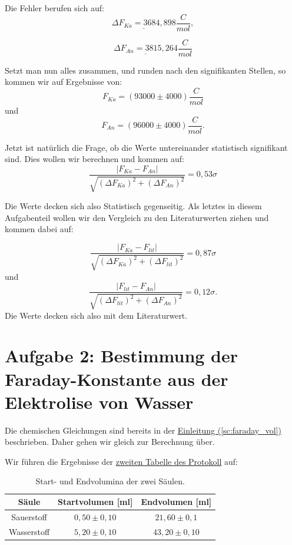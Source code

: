 Die Fehler berufen sich auf:
\begin{equation}
    \underline{\Delta F_{Ka} = 3684,898} \frac{C}{mol},
\end{equation}

\begin{equation}
    \underline{\Delta F_{An} = 3815,264} \frac{C}{mol}
\end{equation}


Setzt man nun alles zusammen, und runden nach den signifikanten Stellen, so kommen wir auf Ergebnisse von:
\begin{equation}
    \boxed{
        F_{Ka} = (93000 \pm 4000) \frac{C}{mol}
    }
\end{equation}
und
\begin{equation}
    \boxed{
        F_{An} = (96000 \pm 4000) \frac{C}{mol}.
    }
\end{equation}

Jetzt ist natürlich die Frage, ob die Werte untereinander statistisch signifikant sind. Dies wollen wir berechnen und kommen auf:
\begin{equation}
    \frac{\left| F_{Ka} - F_{An} \right|}{\sqrt{(\Delta F_{Ka})^2 + (\Delta F_{An})^2} } = 0,53\sigma
\end{equation}

Die Werte decken sich also Statistisch gegenseitig. 
Als letztes in diesem Aufgabenteil wollen wir den Vergleich zu den Literaturwerten ziehen und kommen dabei auf:

\begin{equation}
    \frac{\left| F_{Ka} - F_{lit} \right|}{\sqrt{(\Delta F_{Ka})^2 + (\Delta F_{lit})^2} } = 0,87\sigma
\end{equation}
und
\begin{equation}
    \frac{\left| F_{lit} - F_{An} \right|}{\sqrt{(\Delta F_{lit})^2 + (\Delta F_{An})^2} } = 0,12\sigma.
\end{equation}
Die Werte decken sich also mit dem Literaturwert.



\section{Aufgabe 2: Bestimmung der Faraday-Konstante aus der Elektrolise von Wasser}
Die chemischen Gleichungen sind bereits in der \hyperref[sc:faraday_vol]{Einleitung (\ref*{sc:faraday_vol})} beschrieben. Daher gehen wir gleich zur Berechnung über.


Wir führen die Ergebnisse der \hyperref[Protokoll]{zweiten Tabelle des Protokoll} auf:
\begin{table}
    \centering
    \begin{tabular}{c | c | c}
        \toprule
        Säule & Startvolumen [ml] & Endvolumen [ml] \\
        \hline
        Sauerstoff & $0,50 \pm 0,10$ & $21,60 \pm 0,1$ \\
        Wasserstoff & $5,20 \pm 0,10$ & $43,20 \pm 0,10$ \\
        \bottomrule
    \end{tabular}
    \caption{Start- und Endvolumina der zwei Säulen.}
\end{table}

